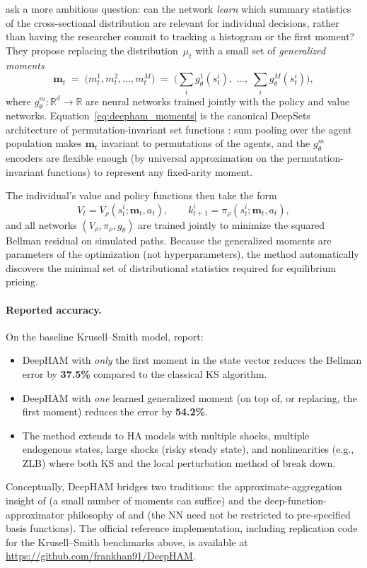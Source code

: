 \documentclass[11pt,a4paper]{report}
\newcommand{\R}{\mathbb{R}}
\begin{document}
\citet{han2023deepham} ask a more ambitious question: can the network \emph{learn} which summary statistics of the cross-sectional distribution are relevant for individual decisions, rather than having the researcher commit to tracking a histogram or the first moment?  They propose replacing the distribution~$\mu_t$ with a small set of \emph{generalized moments}
\begin{equation}
\bm{m}_t \;=\; \bigl(m_t^1, m_t^2, \ldots, m_t^M\bigr) \;=\; \bigl(\textstyle\sum_i g_\theta^1(s_t^i),\; \ldots,\; \sum_i g_\theta^M(s_t^i)\bigr),
\label{eq:deepham_moments}
\end{equation}
where $g_\theta^m : \R^{d} \to \R$ are neural networks trained jointly with the policy and value networks.  Equation~\eqref{eq:deepham_moments} is the canonical DeepSets architecture of permutation-invariant set functions \citep{zaheer2017deep}: sum pooling over the agent population makes $\bm{m}_t$ invariant to permutations of the agents, and the $g_\theta^m$ encoders are flexible enough (by universal approximation on the permutation-invariant functions) to represent any fixed-arity moment.

The individual's value and policy functions then take the form
\begin{equation}
V_t = V_\rho(s_t^i; \bm{m}_t, a_t), \qquad k_{t+1}^i = \pi_\rho(s_t^i; \bm{m}_t, a_t),
\end{equation}
and all networks $(V_\rho, \pi_\rho, g_\theta)$ are trained jointly to minimize the squared Bellman residual on simulated paths.  Because the generalized moments are parameters of the optimization (not hyperparameters), the method automatically discovers the minimal set of distributional statistics required for equilibrium pricing.

\paragraph{Reported accuracy.}
On the baseline Krusell--Smith model, \citet{han2023deepham} report:
\begin{itemize}[itemsep=2pt]
\item DeepHAM with \emph{only} the first moment in the state vector reduces the Bellman error by \textbf{37.5\%} compared to the classical KS algorithm.
\item DeepHAM with \emph{one} learned generalized moment (on top of, or replacing, the first moment) reduces the error by \textbf{54.2\%}.
\item The method extends to HA models with multiple shocks, multiple endogenous states, large shocks (risky steady state), and nonlinearities (e.g., ZLB) where both KS and the local perturbation method of \citet{reiter2009} break down.
\end{itemize}
Conceptually, DeepHAM bridges two traditions: the approximate-aggregation insight of \citet{krusell1998income} (a small number of moments can suffice) and the deep-function-approximator philosophy of \citet{maliar2021deep} and \citet{azinovicDEEPEQUILIBRIUMNETS2022} (the NN need not be restricted to pre-specified basis functions).  The official reference implementation, including replication code for the Krusell--Smith benchmarks above, is available at \url{https://github.com/frankhan91/DeepHAM}.
\end{document}

